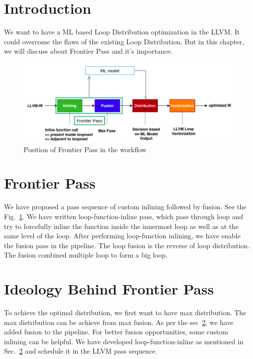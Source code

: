 \section{Introduction}\label{sec:distribution:intro}
We want to have a ML based Loop Distribution optimization in the LLVM. It could overcome the flaws of the existing Loop Distribution. But in this chapter, we will discuss about Frontier Pass and it's importance.

\begin{figure}[t]
    \centering
    \includegraphics[scale=0.4]{figures/chapter-4/distribution_flow.png}
    \caption{Position of Frontier Pass in the workflow}
     \label{fig:dist-flow}
\end{figure}

\section{Frontier Pass}\label{sec:distribution:fp}
 We have proposed a pass sequence of custom inlining followed by fusion. See the Fig.~\ref{fig:dist-flow}. We have written loop-function-inline pass, which pass through loop and try to forcefully inline the function inside the innermost loop as well as at the same level of the loop. After performing loop-function inlining, we have enable the fusion pass in the pipeline. The loop fusion is the reverse of loop distribution. The fusion combined multiple loop to form a big loop. 
 



\section{Ideology Behind Frontier Pass}\label{sec:distribution:ideo}
To achieve the optimal distribution, we first want to have max distribution. The max distribution can be achieve from max fusion. As per the sec~\ref{sec:distribution:fp}, we have added fusion to the pipeline. For better fusion opportunities, some custom inlining can be helpful. We have developed loop-function-inline as mentioned in Sec.~\ref{sec:distribution:fp} and schedule it in the LLVM pass sequence. 

